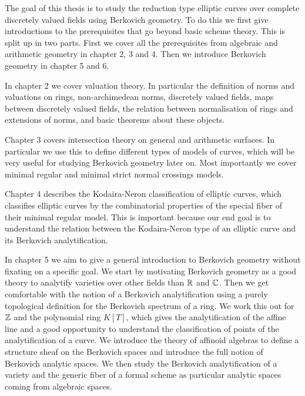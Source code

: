 The goal of this thesis is to study the reduction type elliptic curves over complete discretely valued fields using Berkovich geometry. 
To do this we first give introductions to the prerequisites that go beyond basic scheme theory.
This is split up in two parts. First we cover all the prerequisites from algebraic and arithmetic geometry in chapter 2, 3 and 4. 
Then we introduce Berkovich geometry in chapter 5 and 6. 

\medskip

In chapter 2 we cover valuation theory. In particular the definition of norms and valuations on rings, non-archimedean norms, discretely valued fields, maps between discretely valued fields, the relation between normalisation of rings and extensions of norms, and basic theorems about these objects. 

Chapter 3 covers intersection theory on general and arithmetic surfaces. 
In particular we use this to define different types of models of curves, which will be very useful for studying Berkovich geometry later on. Most importantly we cover minimal regular and minimal strict normal crossings models.

Chapter 4 describes the Kodaira-Neron classification of elliptic curves, which classifies elliptic curves by the combinatorial properties of the special fiber of their minimal regular model. 
This is important because our end goal is to understand the relation between the Kodaira-Neron type of an elliptic curve and its Berkovich analytification.

\medskip


In chapter 5 we aim to give a general introduction to Berkovich geometry without fixating on a specific goal. 
We start by motivating Berkovich geometry as a good theory to analytify varieties over other fields than $\mathbb{R}$ and $\mathbb{C}$. 
Then we get comfortable with the notion of a Berkovich analytification using a purely topological definition for the Berkovich spectrum of a ring. 
We work this out for $\mathbb{Z}$ and the polynomial ring $K[T]$, which gives the analytification of the affine line and a good opportunity to understand the classification of points of the analytification of a curve. 
We introduce the theory of affinoid algebras to define a structure sheaf on the Berkovich spaces and introduce the full notion of Berkovich analytic spaces. 
We then study the Berkovich analytification of a variety and the generic fiber of a formal scheme as particular analytic spaces coming from algebraic spaces. 

